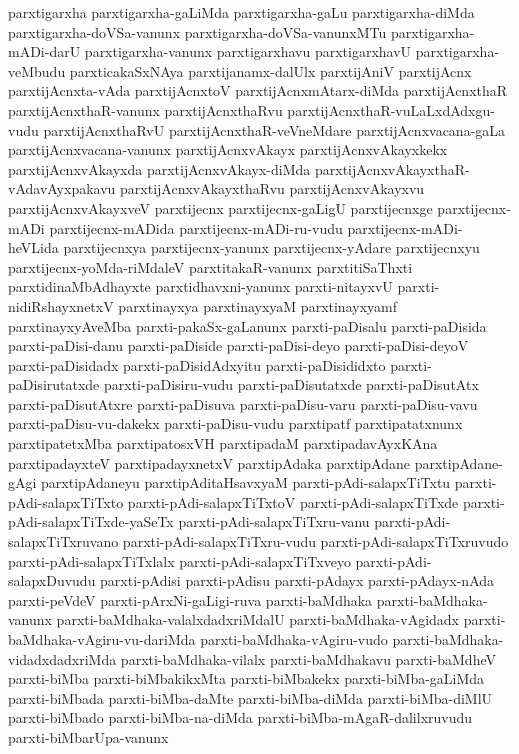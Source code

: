{parxtigarxha
parxtigarxha-gaLiMda
parxtigarxha-gaLu
parxtigarxha-diMda
parxtigarxha-doVSa-vanunx
parxtigarxha-doVSa-vanunxMTu
parxtigarxha-mADi-darU
parxtigarxha-vanunx
parxtigarxhavu
parxtigarxhavU
parxtigarxha-veMbudu
parxticakaSxNAya
parxtijanamx-dalUlx
parxtijAniV
parxtijAcnx
parxtijAcnxta-vAda
parxtijAcnxtoV
parxtijAcnxmAtarx-diMda
parxtijAcnxthaR
parxtijAcnxthaR-vanunx
parxtijAcnxthaRvu
parxtijAcnxthaR-vuLaLxdAdxgu-vudu
parxtijAcnxthaRvU
parxtijAcnxthaR-veVneMdare
parxtijAcnxvacana-gaLa
parxtijAcnxvacana-vanunx
parxtijAcnxvAkayx
parxtijAcnxvAkayxkekx
parxtijAcnxvAkayxda
parxtijAcnxvAkayx-diMda
parxtijAcnxvAkayxthaR-vAdavAyxpakavu
parxtijAcnxvAkayxthaRvu
parxtijAcnxvAkayxvu
parxtijAcnxvAkayxveV
parxtijecnx
parxtijecnx-gaLigU
parxtijecnxge
parxtijecnx-mADi
parxtijecnx-mADida
parxtijecnx-mADi-ru-vudu
parxtijecnx-mADi-heVLida
parxtijecnxya
parxtijecnx-yanunx
parxtijecnx-yAdare
parxtijecnxyu
parxtijecnx-yoMda-riMdaleV
parxtitakaR-vanunx
parxtitiSaThxti
parxtidinaMbAdhayxte
parxtidhavxni-yanunx
parxti-nitayxvU
parxti-nidiRshayxnetxV
parxtinayxya
parxtinayxyaM
parxtinayxyamf
parxtinayxyAveMba
parxti-pakaSx-gaLanunx
parxti-paDisalu
parxti-paDisida
parxti-paDisi-danu
parxti-paDiside
parxti-paDisi-deyo
parxti-paDisi-deyoV
parxti-paDisidadx
parxti-paDisidAdxyitu
parxti-paDisididxto
parxti-paDisirutatxde
parxti-paDisiru-vudu
parxti-paDisutatxde
parxti-paDisutAtx
parxti-paDisutAtxre
parxti-paDisuva
parxti-paDisu-varu
parxti-paDisu-vavu
parxti-paDisu-vu-dakekx
parxti-paDisu-vudu
parxtipatf
parxtipatatxnunx
parxtipatetxMba
parxtipatosxVH
parxtipadaM
parxtipadavAyxKAna
parxtipadayxteV
parxtipadayxnetxV
parxtipAdaka
parxtipAdane
parxtipAdane-gAgi
parxtipAdaneyu
parxtipAditaHsavxyaM
parxti-pAdi-salapxTiTxtu
parxti-pAdi-salapxTiTxto
parxti-pAdi-salapxTiTxtoV
parxti-pAdi-salapxTiTxde
parxti-pAdi-salapxTiTxde-yaSeTx
parxti-pAdi-salapxTiTxru-vanu
parxti-pAdi-salapxTiTxruvano
parxti-pAdi-salapxTiTxru-vudu
parxti-pAdi-salapxTiTxruvudo
parxti-pAdi-salapxTiTxlalx
parxti-pAdi-salapxTiTxveyo
parxti-pAdi-salapxDuvudu
parxti-pAdisi
parxti-pAdisu
parxti-pAdayx
parxti-pAdayx-nAda
parxti-peVdeV
parxti-pArxNi-gaLigi-ruva
parxti-baMdhaka
parxti-baMdhaka-vanunx
parxti-baMdhaka-valalxdadxriMdalU
parxti-baMdhaka-vAgidadx
parxti-baMdhaka-vAgiru-vu-dariMda
parxti-baMdhaka-vAgiru-vudo
parxti-baMdhaka-vidadxdadxriMda
parxti-baMdhaka-vilalx
parxti-baMdhakavu
parxti-baMdheV
parxti-biMba
parxti-biMbakikxMta
parxti-biMbakekx
parxti-biMba-gaLiMda
parxti-biMbada
parxti-biMba-daMte
parxti-biMba-diMda
parxti-biMba-diMlU
parxti-biMbado
parxti-biMba-na-diMda
parxti-biMba-mAgaR-dalilxruvudu
parxti-biMbarUpa-vanunx
}
